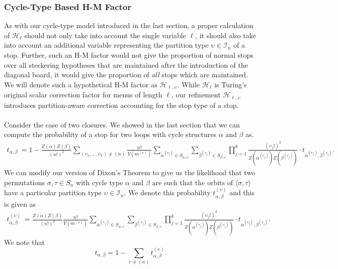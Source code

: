 \subsubsection{Cycle-Type Based H-M Factor}
As with our cycle-type model introduced in the last section, a proper
calculation of $\mathcal{H}_\ell$ should not only take into account the
single variable $\ell$, it should also take into account an additional
variable representing the partition type $\upsilon\in\mathcal{I}_n$ of a stop.
Further, such an H-M factor would not give the proportion of normal
stops over all steckering hypotheses that are maintained after the
introduction of the diagonal board, it would give the proportion of
\emph{all} stops which are maintained. We will denote such a
hypothetical H-M factor as $\mathcal{H}_{\ell,\upsilon}$. While
$\mathcal{H}_\ell$ is Turing's original scalar correction factor for
menus of length $\ell$, our refinement $\mathcal{H}_{\ell,\upsilon}$
introduces partition-aware correction accounting for the stop type of a stop.
\\\\Consider the case of two closures. We showed in the last section
that we can compute the probability of a stop for two loops with
cycle structures $\alpha$ and $\beta$ as.
\begin{align*}
  t_{\alpha, \beta}\ = 1 -
  \frac{Z(\alpha)Z(\beta)}{(n!)^2}\sum_{(\upsilon_1,\dots,\upsilon_k)\ne(n)}\frac{n!}{Y(m^{(\upsilon)})}\sum_{\alpha^{(\upsilon_j)}\in
  S_{\alpha,\upsilon}}\sum_{\beta^{(\upsilon_j)}\in
  S_{\beta,\upsilon}}\prod_{j=1}^k
  {\frac{(\upsilon_j!)^2}{Z(\alpha^{(\upsilon_j)})Z(\beta^{(\upsilon_j)})}}\cdot
  t_{\alpha^{(\upsilon_j)},\beta^{(\upsilon_j)}}.
\end{align*}
We can modify our version of Dixon's Theorem to give us the
likelihood that two permutations $\sigma,\tau\in S_n$ with cycle type
$\alpha$ and $\beta$ are such that the orbits of
$\langle\sigma,\tau\rangle$ have a particular partition type
$\upsilon\in\mathcal{I}_n$. We
denote this probability $t_{\alpha,\beta}^{(\upsilon)}$ and this is given as
\begin{align*}
  t_{\alpha,\beta}^{(\upsilon)}\ =\frac{Z(\alpha)Z(\beta)}{(n!)^2}\frac{n!}{Y(m^{(\upsilon)})}\sum_{\alpha^{(\upsilon_j)}\in
  S_{\alpha,\upsilon}}\sum_{\beta^{(\upsilon_j)}\in
  S_{\beta,\upsilon}}\prod_{j=1}^k
  {\frac{(\upsilon_j!)^2}{Z(\alpha^{(\upsilon_j)})Z(\beta^{(\upsilon_j)})}}\cdot
  t_{\alpha^{(\upsilon_j)},\beta^{(\upsilon_j)}}.
\end{align*}
We note that
\[
  t_{\alpha,\beta} = 1 -
  \sum_{\upsilon\ne(n)}t_{\alpha,\beta}^{(\upsilon)}.
\]
